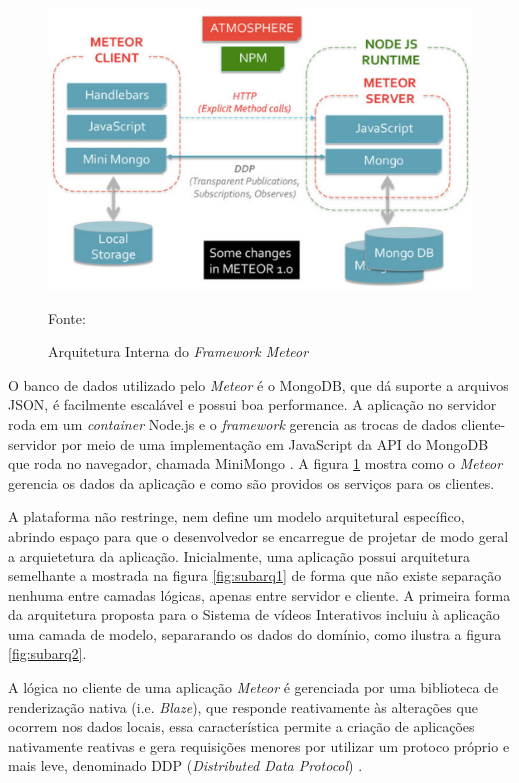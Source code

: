 \begin{figure}[h!]
	\centering
	\includegraphics[width=.8\linewidth]{figuras/meteorarq.eps}	
  	\caption{Arquitetura Interna do \textit{Framework Meteor}}
	\small{Fonte: \cite{mongodb2015}}
  	\label{fig:meteorarq}
\end{figure}

O banco de dados utilizado pelo \textit{Meteor} é o MongoDB, que dá suporte a arquivos JSON, é facilmente escalável e possui boa performance. A aplicação no servidor roda em um \textit{container} Node.js e o \textit{framework} gerencia as trocas de dados cliente-servidor por meio de uma implementação em JavaScript da API do MongoDB que roda no navegador, chamada MiniMongo \cite{mongodb2015}. A figura \ref{fig:meteorarq} mostra como o \textit{Meteor}  gerencia os dados da aplicação e como são providos os serviços para os clientes. 

A plataforma não restringe, nem define um modelo arquitetural específico, abrindo espaço para que o desenvolvedor se encarregue de projetar de modo geral a arquietetura da aplicação. Inicialmente, uma aplicação possui arquitetura semelhante a mostrada na figura \ref{fig:subarq1} de forma que não existe separação nenhuma entre camadas lógicas, apenas entre servidor e cliente. A primeira forma da arquitetura proposta para o Sistema de vídeos Interativos incluiu à aplicação uma camada de modelo, separarando os dados do domínio, como ilustra a figura \ref{fig:subarq2}.

A lógica no cliente de uma aplicação \textit{Meteor} é gerenciada por uma biblioteca de renderização nativa (i.e. \textit{Blaze}), que responde reativamente às alterações que ocorrem nos dados locais, essa característica permite a criação de aplicações nativamente reativas e gera requisições menores por utilizar um protoco próprio e mais leve, denominado DDP (\textit{Distributed Data Protocol}) \cite{blaze2015}. 

